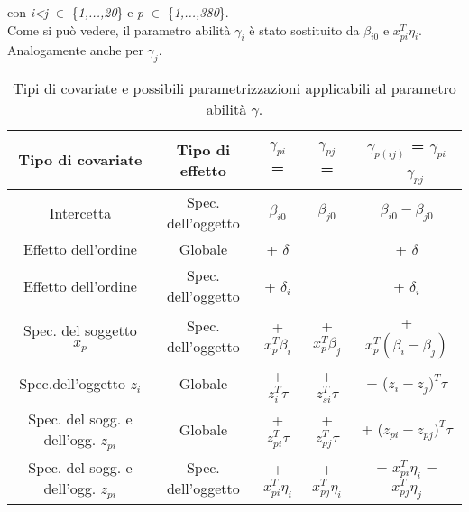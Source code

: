 con \emph{i<j} $\in$ \{\emph{1,...,20}\} e \emph{p} $\in$ \{\emph{1,...,380}\}.\\
Come si può vedere, il parametro abilità $\gamma_{i}$ è stato sostituito da $\beta_{i0}$ e $ x^T_{pi}\eta_i$. Analogamente anche per $\gamma_{j}$.
\begin{table}[!htb]%
	
	\renewcommand{\arraystretch}{1.7}
	\centering
	\begin{tabular}{c c c c c}
		\hline	
		
		\textbf{Tipo di covariate} & \textbf{Tipo di effetto} & \textbf{$\gamma_{pi}$ =}& \textbf{$\gamma_{pj}$ =} & \textbf{$\gamma_{p(ij)}$ = $\gamma_{pi}$ $-$ $\gamma_{pj}$} \\	
		\hline			
		Intercetta & Spec. dell'oggetto & $\beta_{i0}$ & $\beta_{j0}$ & $\beta_{i0} - \beta_{j0}$\\
		Effetto dell'ordine & Globale & + $\delta$ &  & + $\delta$ \\
		Effetto dell'ordine & Spec. dell'oggetto &  + $\delta_i$ &  &  + $\delta_i$\\
		Spec. del soggetto $x_p$ & Spec. dell'oggetto & + $x^T_p\beta_i$ & + $x^T_p\beta_j$ & + $x^T_p(\beta_i - \beta_j)$\\
		Spec.dell'oggetto  $z_i$ & Globale & + $z^T_{i}\tau$ & + $z^T_{si}\tau$ & + ($z_{i} - z_{j})^T\tau$\\
		Spec. del sogg. e dell'ogg. $z_{pi}$ & Globale & + $z^T_{pi}\tau$ & + $z^T_{pj}\tau$ & + ($z_{pi} - z_{pj})^T\tau$\\
		Spec. del sogg. e dell'ogg. $z_{pi}$ & Spec. dell'oggetto & + $x^T_{pi}\eta_i$ & + $x^T_{pj}\eta_i$& + $x^T_{pi}\eta_i$ $-$ $x^T_{pj}\eta_j$\\
		\hline
		
		
	\end{tabular} \hbox{}
	
	\caption{Tipi di covariate e possibili parametrizzazioni applicabili al parametro abilità $\gamma$.} \label{tab:type}
\end{table}

